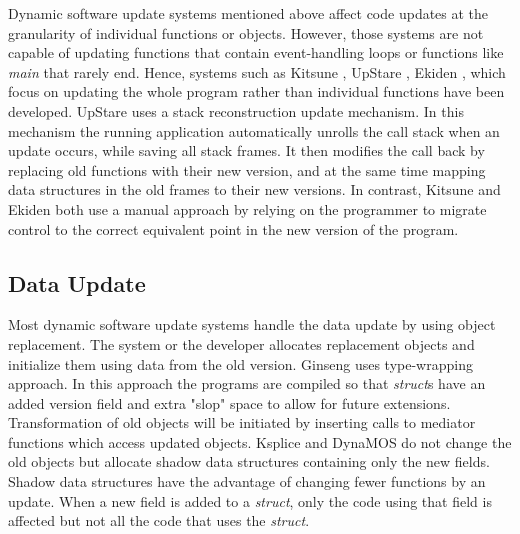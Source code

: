 \documentclass[a4paper,11pt,twoside]{report}
\begin{document}
Dynamic software update systems mentioned above affect code updates at the granularity of individual functions or objects. However, those systems are not capable of updating functions that contain event-handling loops or functions like \textit{main} that rarely end. Hence, systems such as Kitsune  \cite{Kitsune}, UpStare  \cite{UpStare}, Ekiden  \cite{Eiken}, which focus on updating the whole program rather than individual functions have been developed. UpStare uses a stack reconstruction update mechanism. In this mechanism the running application automatically unrolls the call stack when an update occurs, while saving all stack frames. It then modifies the call back by replacing old functions with their new version, and at the same time mapping data structures in the old frames to their new versions. In contrast, Kitsune and Ekiden both use a manual approach by relying on the programmer to migrate control to the correct equivalent point in the new version of the program.


\subsection{Data Update} 
Most dynamic software update systems handle the data update by using object replacement. The system or the developer allocates replacement objects and initialize them using data from the old version. Ginseng uses type-wrapping approach. In this approach the programs are compiled so that \textit{struct}s have an added version field and extra "slop" space to allow for future extensions. Transformation of old objects will be initiated by inserting calls to mediator functions which access updated objects. Ksplice and DynaMOS do not change the old objects but allocate shadow data structures containing only the new fields. Shadow data structures have the advantage of changing fewer functions by an update. When a new field is added to a \textit{struct}, only the code using that field is affected but not all the code that uses the \textit{struct}. 
\end{document}
